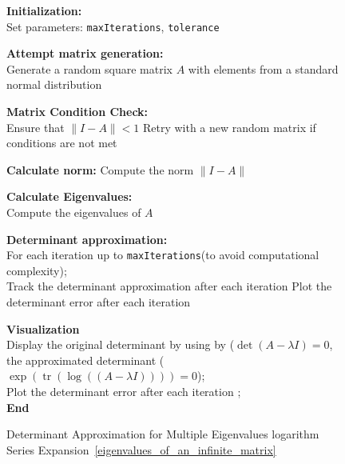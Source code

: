 \begin{figure}[H]
    \centering
    \begin{algorithm}[H]
        \caption{Determinant Approximation for Multiple Eigenvalues logarithm Series Expansion~\ref{eigenvalues_of_an_infinite_matrix}}
        \label{alg-eig}


        \textbf{Initialization:}\\
        Set parameters: \texttt{maxIterations}, \texttt{tolerance}\;

        \textbf{Attempt matrix generation:}\\
        Generate a random square matrix $A$ with elements from a standard normal distribution\;

        \textbf{Matrix Condition Check:}\\
        Ensure that $\|I - A\| < 1$\;
        Retry with a new random matrix if conditions are not met\;


        \textbf{Calculate norm:}
        Compute the norm $\|I - A\|$\;


        \textbf{Calculate Eigenvalues:}\\
        Compute the eigenvalues of $A$\;


            \textbf{Determinant approximation:}\\
            For each iteration up to \texttt{maxIterations}(to avoid computational
            complexity);\\
            Track the determinant approximation after each iteration\;
            Plot the determinant error after each iteration\;
            

            \textbf{Visualization}\\
            Display the original determinant by using by ($\det(A-\lambda I)=0$, the approximated determinant ($\exp(\operatorname{tr}(\log((A-\lambda I))))=0$);\\
            Plot the determinant error after each iteration ; \\     
        \textbf{End}
    \end{algorithm}
\end{figure}
